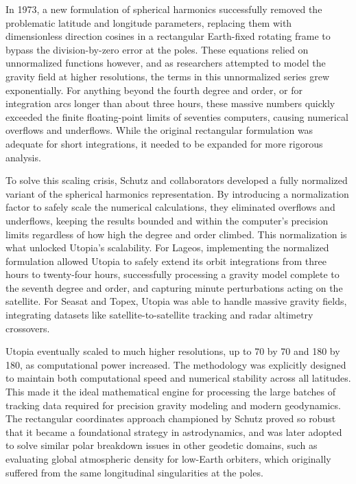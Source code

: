 In 1973, a new formulation of spherical harmonics successfully removed the problematic latitude and longitude parameters, replacing them with dimensionless direction cosines in a rectangular Earth-fixed rotating frame to bypass the division-by-zero error at the poles. These equations relied on unnormalized functions however, and as researchers attempted to model the gravity field at higher resolutions, the terms in this unnormalized series grew exponentially. For anything beyond the fourth degree and order, or for integration arcs longer than about three hours, these massive numbers quickly exceeded the finite floating-point limits of seventies computers, causing numerical overflows and underflows. While the original rectangular formulation was adequate for short integrations, it needed to be expanded for more rigorous analysis. 

To solve this scaling crisis, Schutz and collaborators developed a fully normalized variant of the spherical harmonics representation. By introducing a normalization factor to safely scale the numerical calculations, they eliminated overflows and underflows, keeping the results bounded and within the computer's precision limits regardless of how high the degree and order climbed. This normalization is what unlocked Utopia's scalability. For Lageos, implementing the normalized formulation allowed Utopia to safely extend its orbit integrations from three hours to twenty-four hours, successfully processing a gravity model complete to the seventh degree and order, and capturing minute perturbations acting on the satellite. For Seasat and Topex, Utopia was able to handle massive gravity fields, integrating datasets like satellite-to-satellite tracking and radar altimetry crossovers. 

Utopia eventually scaled to much higher resolutions, up to 70 by 70 and 180 by 180, as computational power increased. The methodology was explicitly designed to maintain both computational speed and numerical stability across all latitudes. This made it the ideal mathematical engine for processing the large batches of tracking data required for precision gravity modeling and modern geodynamics. The rectangular coordinates approach championed by Schutz proved so robust that it became a foundational strategy in astrodynamics, and was later adopted to solve similar polar breakdown issues in other geodetic domains, such as evaluating global atmospheric density for low-Earth orbiters, which originally suffered from the same longitudinal singularities at the poles.

